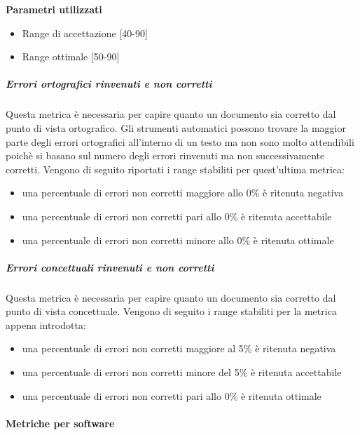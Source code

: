 \textbf{Parametri utilizzati}\\
\begin{itemize}
\item Range di accettazione [40-90]
\item Range ottimale [50-90]
\end{itemize}

\subparagraph{Errori ortografici rinvenuti e non corretti} 
Questa metrica è necessaria per capire quanto un documento sia corretto dal punto di vista ortografico. Gli strumenti automatici possono trovare la maggior parte degli errori ortografici all'interno di un testo ma non sono molto attendibili poichè si basano sul numero degli errori rinvenuti ma non successivamente corretti. Vengono di seguito riportati i range stabiliti per quest'ultima metrica:
\begin{itemize}
\item una percentuale di errori non corretti maggiore allo 0\% è ritenuta negativa
\item una percentuale di errori non corretti pari allo 0\% è ritenuta accettabile
\item una percentuale di errori non corretti minore allo 0\% è ritenuta ottimale
\end{itemize}

\subparagraph{Errori concettuali rinvenuti e non corretti} 
Questa metrica è necessaria per capire quanto un documento sia corretto dal punto di vista concettuale. Vengono di seguito i range stabiliti per la metrica appena introdotta:
\begin{itemize}
\item una percentuale di errori non corretti maggiore al 5\% è ritenuta negativa
\item una percentuale di errori non corretti minore del 5\% è ritenuta accettabile 
\item una percentuale di errori non corretti pari allo 0\% è ritenuta ottimale
\end{itemize}





\paragraph{Metriche per software}

